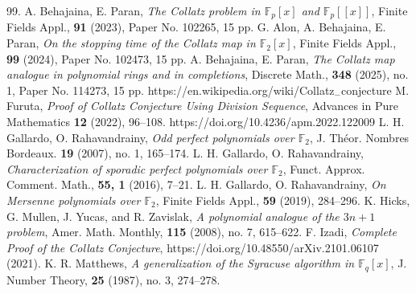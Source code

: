 \documentclass [12pt]{article}
\def\F{\mathbb{F}}
\begin{document}
\begin{thebibliography}{99.}
 A. Behajaina, E. Paran, \textit{The Collatz problem in $\F_p[x]$ and $\F_p[[x]]$}, Finite Fields Appl.,
\textbf{91} (2023), Paper No. 102265, 15 pp.
 G. Alon, A. Behajaina, E. Paran, \textit{On the stopping time of the Collatz map in $\F_2[x]$}, Finite Fields Appl.,
\textbf{99} (2024), Paper No. 102473, 15 pp.
 A. Behajaina, E. Paran, \textit{The Collatz map analogue in polynomial rings and in completions}, Discrete Math.,
\textbf{348} (2025), no. 1, Paper No. 114273, 15 pp.
 https://en.wikipedia.org/wiki/Collatz$_{-}$conjecture
 M. Furuta, \textit{Proof of Collatz Conjecture Using Division
Sequence}, Advances in Pure Mathematics \textbf{12} (2022), 96--108.
https://doi.org/10.4236/apm.2022.122009
  L. H. Gallardo, O. Rahavandrainy, \textit{Odd perfect polynomials
over $\F_2$}, J. Th\'eor. Nombres Bordeaux.
\textbf{19} (2007),  no. 1, 165--174.
 L. H. Gallardo, O. Rahavandrainy, \textit{Characterization of sporadic perfect polynomials over $\F_2$},
 Funct. Approx. Comment. Math.,
\textbf{55, 1} (2016), 7--21.
 L. H. Gallardo, O. Rahavandrainy, \textit{On Mersenne polynomials over $\F_{2}$},
Finite Fields Appl.,
\textbf{59} (2019), 284--296.
K. Hicks, G. Mullen,  J. Yucas, and R. Zavislak, \textit{A polynomial analogue of the $3n+1$ problem}, Amer. Math. Monthly,
\textbf{115} (2008), no. 7, 615--622.
 F. Izadi, \textit{Complete Proof of the Collatz Conjecture}, https://doi.org/10.48550/arXiv.2101.06107 (2021).
 K. R. Matthews, \textit{A generalization of the Syracuse algorithm in $\F_{q}[x]$}, J. Number Theory,
\textbf{25} (1987), no. 3, 274--278.
\end{thebibliography}
\end{document}
